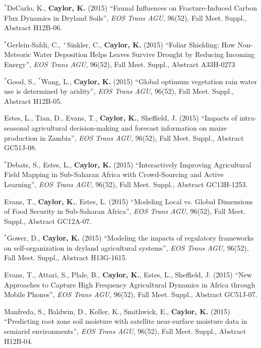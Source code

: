 \documentclass[10pt]{article}
\begin{document}
\begin{etaremune}
\item $^{*}$DeCarlo, K., \textbf{Caylor, K.} (2015) ``Faunal Influences on Fracture-Induced Carbon Flux Dynamics in Dryland Soils'', \emph{EOS Trans AGU}, 96(52), Fall Meet. Suppl., Abstract H12B-06.

\item $^{*}$Gerlein-Safdi, C., $^{+}$Sinkler, C., \textbf{Caylor, K.} (2015) ``Foliar Shielding: How Non-Meteoric Water Deposition Helps Leaves Survive Drought by Reducing Incoming Energy'', \emph{EOS Trans AGU}, 96(52), Fall Meet. Suppl., Abstract A33H-0273

\item $^{*}$Good, S., $^{*}$Wang, L., \textbf{Caylor, K.} (2015) ``Global optimum vegetation rain water use is determined by aridity'', \emph{EOS Trans AGU}, 96(52), Fall Meet. Suppl., Abstract H12B-05.

\item Estes, L., Tian, D., Evans, T.,  \textbf{Caylor, K.}, Sheffield, J. (2015) ``Impacts of intra-seasonal agricultural decision-making and forecast information on maize production in Zambia'',  \emph{EOS Trans AGU}, 96(52), Fall Meet. Suppl., Abstract GC51J-08.

\item $^{*}$Debats, S., Estes, L., \textbf{Caylor, K.} (2015) ``Interactively Improving Agricultural Field Mapping in Sub-Saharan Africa with Crowd-Sourcing and Active Learning'',  \emph{EOS Trans AGU}, 96(52), Fall Meet. Suppl., Abstract GC13H-1253.

\item Evans, T., \textbf{Caylor, K.}, Estes, L. (2015) ``Modeling Local vs. Global Dimensions of Food Security in Sub-Saharan Africa'', \emph{EOS Trans AGU}, 96(52), Fall Meet. Suppl., Abstract GC12A-07.

\item $^{*}$Gower, D., \textbf{Caylor, K.} (2015) ``Modeling the impacts of regulatory frameworks on self-organization in dryland agricultural systems'', \emph{EOS Trans AGU}, 96(52), Fall Meet. Suppl., Abstract H13G-1615.

\item Evans, T., Attari, S., Plale, B., \textbf{Caylor, K.}, Estes, L., Sheffield, J. (2015) ``New Approaches to Capture High Frequency Agricultural Dynamics in Africa through Mobile Phones'', \emph{EOS Trans AGU}, 96(52), Fall Meet. Suppl., Abstract GC51J-07.

\item Manfreda, S., Baldwin, D., Keller, K., Smithwick, E., \textbf{Caylor, K.} (2015) ``Predicting root zone soil moisture with satellite near-surface moisture data in semiarid environments'',  \emph{EOS Trans AGU}, 96(52), Fall Meet. Suppl., Abstract H12B-04.


\end{etaremune}
\end{document}
